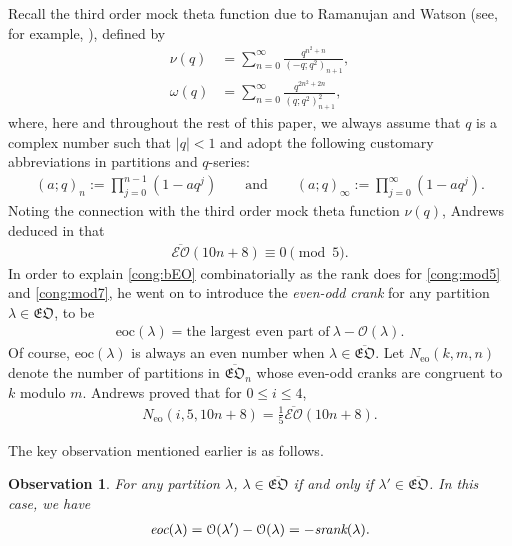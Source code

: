 \documentclass[12pt,reqno]{amsart}
\numberwithin{equation}{section}
\theoremstyle{plain}
\newtheorem{observation}[theorem]{Observation}
\theoremstyle{definition}
\begin{document}
Recall the third order mock theta function due to Ramanujan and Watson (see, for example, \cite{ADY}),
defined by
\begin{align}
\nu(q) &=\sum_{n=0}^{\infty}\frac{q^{n^2+n}}{(-q;q^2)_{n+1}},\label{def:nu}\\
\omega(q) &=\sum_{n=0}^{\infty}\frac{q^{2n^2+2n}}{(q;q^2)_{n+1}^2},\label{def:omega}
\end{align}
where, here and throughout the rest of this paper, we always assume that $q$ is a complex number such that
$|q|<1$ and adopt the following customary abbreviations in partitions and $q$-series:
\begin{align*}
(a;q)_n:=\prod_{j=0}^{n-1}(1-aq^j)\qquad\textrm{and}\qquad(a;q)_\infty:=\prod_{j=0}^\infty(1-aq^j).
\end{align*}
Noting the connection with the third order mock theta function $\nu(q)$, Andrews deduced in \cite{and2}
that
\begin{align}\label{cong:bEO}
\overline{\mathcal{EO}}(10n+8)\equiv0\pmod{5}.
\end{align}
In order to explain \eqref{cong:bEO} combinatorially as the rank does for \eqref{cong:mod5} and
\eqref{cong:mod7}, he went on to introduce the \textit{even-odd crank} for any partition
$\lambda\in\mathfrak{EO}$, to be
\begin{align}\label{eo-crank}
\textrm{eoc}(\lambda)=\textrm{the~largest~even~part~of}~\lambda-\mathcal{O}(\lambda).
\end{align}
Of course, $\textrm{eoc}(\lambda)$ is always an even number when $\lambda\in\overline{\mathfrak{EO}}$. Let
$N_{\textrm{eo}}(k,m,n)$ denote the number of partitions in $\overline{\mathfrak{EO}}_n$ whose even-odd
cranks are congruent to $k$ modulo $m$. Andrews \cite[Theorem~3.3]{and2} proved that for $0\leq i\leq 4$,
\begin{align}
N_{\textrm{eo}}(i,5,10n+8)=\frac{1}{5}\overline{\mathcal{EO}}(10n+8).\label{eq:1/5}
\end{align}

The key observation mentioned earlier is as follows.

\begin{observation}\label{ob:key}
For any partition $\lambda$, $\lambda\in\overline{\mathfrak{EO}}$ if and only if
$\lambda'\in\overline{\mathfrak{EO}}$. In this case, we have
\begin{align}\label{eq:Andrews=Stanley}
\emph{eoc}(\lambda)=\mathcal{O}(\lambda')-\mathcal{O}(\lambda)=-\emph{srank}(\lambda).
\end{align}
\end{observation}
\end{document}
